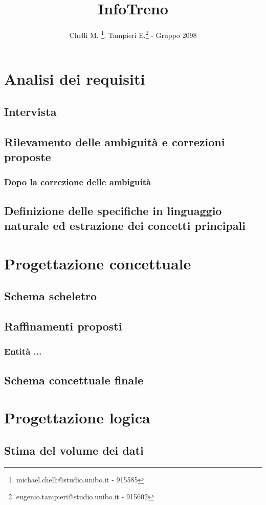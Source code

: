 \documentclass[a4paper,12pt]{report}
\title{InfoTreno}
\author{Chelli M. \thanks{michael.chelli@studio.unibo.it - 915585}, Tampieri E.\thanks{eugenio.tampieri@studio.unibo.it - 915602} - Gruppo 2098}
\begin{document}
	\maketitle
	\tableofcontents
	\chapter{Analisi dei requisiti}
	\section{Intervista}
	\section{Rilevamento delle ambiguità e correzioni proposte}
	\subsection{Dopo la correzione delle ambiguità}
	\section{Definizione delle specifiche in linguaggio naturale ed estrazione dei concetti principali}
	\chapter{Progettazione concettuale}
	\section{Schema scheletro}
	\section{Raffinamenti proposti}
	\subsection{Entità ...}
	\section{Schema concettuale finale}
	\chapter{Progettazione logica}
	\section{Stima del volume dei dati}
\end{document}
